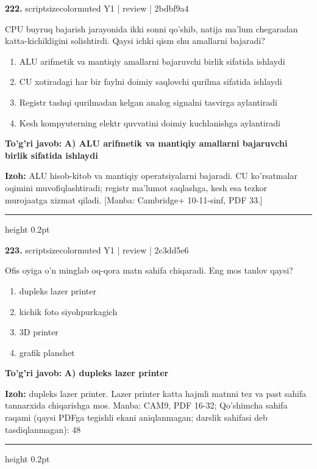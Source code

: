 \documentclass[10pt,a4paper]{article}
\begin{document}
{\bfseries\sffamily\color{ink} 222.} {scriptsizecolor{muted} Y1 | review | 2bdbf9a4}
\par
CPU buyruq bajarish jarayonida ikki sonni qo'shib, natija ma'lum chegaradan katta-kichikligini solishtirdi. Qaysi ichki qism shu amallarni bajaradi?
\begin{enumerate}[label=\Alph*),leftmargin=9mm]
\item ALU arifmetik va mantiqiy amallarni bajaruvchi birlik sifatida ishlaydi
\item CU xotiradagi har bir faylni doimiy saqlovchi qurilma sifatida ishlaydi
\item Registr tashqi qurilmadan kelgan analog signalni tasvirga aylantiradi
\item Kesh kompyuterning elektr quvvatini doimiy kuchlanishga aylantiradi
\end{enumerate}
\begin{tcolorbox}[enhanced,breakable,colback=teal!4,colframe=teal!60!black,boxrule=0.45pt,arc=1.2mm,left=2.7mm,right=2.7mm,top=1.8mm,bottom=1.8mm,before skip=2mm,after skip=2mm]
{\bfseries\sffamily\color{teal}To'g'ri javob:} \textbf{A) ALU arifmetik va mantiqiy amallarni bajaruvchi birlik sifatida ishlaydi}
\par\smallskip
{\bfseries Izoh:} ALU hisob-kitob va mantiqiy operatsiyalarni bajaradi. CU ko'rsatmalar oqimini muvofiqlashtiradi; registr ma'lumot saqlashga, kesh esa tezkor murojaatga xizmat qiladi. [Manba: Cambridge+ 10-11-sinf, PDF 33.]
\end{tcolorbox}
\vspace{2mm}\hrule height 0.2pt\vspace{3mm}

{\bfseries\sffamily\color{ink} 223.} {scriptsizecolor{muted} Y1 | review | 2c3dd5e6}
\par
Ofis oyiga o'n minglab oq-qora matn sahifa chiqaradi. Eng mos tanlov qaysi?
\begin{enumerate}[label=\Alph*),leftmargin=9mm]
\item dupleks lazer printer
\item kichik foto siyohpurkagich
\item 3D printer
\item grafik planshet
\end{enumerate}
\begin{tcolorbox}[enhanced,breakable,colback=teal!4,colframe=teal!60!black,boxrule=0.45pt,arc=1.2mm,left=2.7mm,right=2.7mm,top=1.8mm,bottom=1.8mm,before skip=2mm,after skip=2mm]
{\bfseries\sffamily\color{teal}To'g'ri javob:} \textbf{A) dupleks lazer printer}
\par\smallskip
{\bfseries Izoh:} dupleks lazer printer. Lazer printer katta hajmli matnni tez va past sahifa tannarxida chiqarishga mos. Manba: CAM9, PDF 16-32; Qo'shimcha sahifa raqami (qaysi PDFga tegishli ekani aniqlanmagan; darslik sahifasi deb tasdiqlanmagan): 48
\end{tcolorbox}
\vspace{2mm}\hrule height 0.2pt\vspace{3mm}
\end{document}
